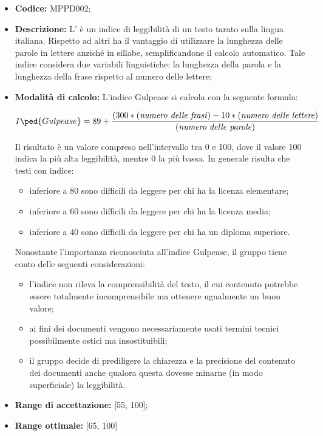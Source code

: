 \documentclass[openany,12pt,a4paper]{report}
\begin{document}
\begin{itemize}
    \item \textbf{Codice:} MPPD002;

    \item \textbf{Descrizione:} L’ è un indice di leggibilità di un testo tarato sulla lingua italiana. Rispetto ad altri ha il vantaggio di utilizzare la lunghezza delle parole in lettere anziché in sillabe, semplificandone il calcolo automatico. Tale indice considera due variabili linguistiche: la lunghezza della parola e la lunghezza della frase rispetto al numero delle lettere;
    
    \item \textbf{Modalità di calcolo:} L'indice Gulpease si calcola con la seguente formula:

    \[ I\ped{Gulpease} = 89 +  \frac{(300*(\textrm{\textit{numero delle frasi}})-10*(\textrm{\textit{numero delle lettere}})}{(\textrm{\textit{numero delle parole}})} \]
    
    Il risultato è un valore compreso nell’intervallo tra 0 e 100, dove il valore 100 indica la
    più alta leggibilità, mentre 0 la più bassa. In generale risulta che testi con indice:
        \begin{itemize}
            \item inferiore a 80 sono difficili da leggere per chi ha la licenza elementare; 
            \item inferiore a 60 sono difficili da leggere per chi ha la licenza media;
            \item inferiore a 40 sono difficili da leggere per chi ha un diploma superiore.
        \end{itemize}
            
    Nonostante l'importanza riconosciuta all'indice Gulpease, il gruppo tiene conto delle seguenti considerazioni:
    \begin{itemize}
        \item l'indice non rileva la comprensibilità del testo, il cui contenuto potrebbe essere totalmente incomprensibile ma ottenere ugualmente un buon valore; 
        \item ai fini dei documenti vengono necessariamente usati termini tecnici possibilmente ostici ma insostituibili;
        \item il gruppo decide di prediligere la chiarezza e la precisione del contenuto dei documenti anche qualora questa dovesse minarne (in modo superficiale) la leggibilità.
    \end{itemize}
    
    \item \textbf{Range di accettazione:} [55, 100];
    \item \textbf{Range ottimale:} [65, 100]
\end{itemize}
\end{document}
